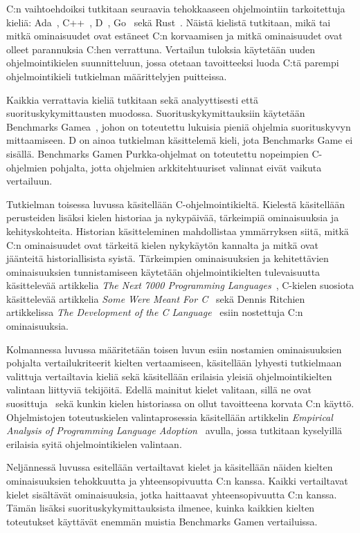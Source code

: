 C:n vaihtoehdoiksi tutkitaan seuraavia tehokkaaseen ohjelmointiin tarkoitettuja
kieliä: Ada~\citep{ADA12}, C++~\citep{CPP17}, D~\citep{D}, Go~\citep{golang}
sekä Rust~\citep{rust}. Näistä kielistä tutkitaan, mikä tai mitkä ominaisuudet
ovat estäneet C:n korvaamisen ja mitkä ominaisuudet ovat olleet parannuksia
C:hen verrattuna. Vertailun tuloksia käytetään uuden ohjelmointikielen
suunnitteluun, jossa otetaan tavoitteeksi luoda C:tä parempi ohjelmointikieli
tutkielman määrittelyjen puitteissa.

Kaikkia verrattavia kieliä tutkitaan sekä analyyttisesti että
suorituskykymittausten muodossa. Suorituskykymittauksiin käytetään Benchmarks
Gamea~\citep{benchmarks}, johon on toteutettu lukuisia pieniä ohjelmia
suorituskyvyn mittaamiseen. D on ainoa tutkielman käsittelemä kieli, jota
Benchmarks Game ei sisällä. Benchmarks Gamen Purkka-ohjelmat on toteutettu
nopeimpien C-ohjelmien pohjalta, jotta ohjelmien arkkitehtuuriset valinnat
eivät vaikuta vertailuun. 

Tutkielman toisessa luvussa käsitellään C-ohjelmointikieltä. Kielestä
käsitellään perusteiden lisäksi kielen historiaa ja nykypäivää, tärkeimpiä
ominaisuuksia ja kehityskohteita. Historian käsitteleminen mahdollistaa
ymmärryksen siitä, mitkä C:n ominaisuudet ovat tärkeitä kielen nykykäytön
kannalta ja mitkä ovat jäänteitä historiallisista syistä. Tärkeimpien
ominaisuuksien ja kehitettävien ominaisuuksien tunnistamiseen käytetään
ohjelmointikielten tulevaisuutta käsittelevää artikkelia \emph{The Next 7000
Programming Languages}~\citep{next7000}, C-kielen suosiota käsittelevää
artikkelia \emph{Some Were Meant For C}~\citep{somemeantforc} sekä Dennis
Ritchien artikkelissa \emph{The Development of the C Language}~\citep{chistory}
esiin nostettuja C:n ominaisuuksia.

Kolmannessa luvussa määritetään toisen luvun esiin nostamien ominaisuuksien
pohjalta vertailukriteerit kielten vertaamiseen, käsitellään lyhyesti
tutkielmaan valittuja vertailtavia kieliä sekä käsitellään erilaisia yleisiä
ohjelmointikielten valintaan liittyviä tekijöitä. Edellä mainitut kielet
valitaan, sillä ne ovat suosittuja~\citep{tiobe} sekä kunkin kielen historiassa
on ollut tavoitteena korvata C:n käyttö. Ohjelmistojen toteutuskielen
valintaprosessia käsitellään artikkelin \emph{Empirical Analysis of Programming
Language Adoption}~\citep{empiricalpopularity} avulla, jossa tutkitaan
kyselyillä erilaisia syitä ohjelmointikielen valintaan.

Neljännessä luvussa esitellään vertailtavat kielet ja käsitellään näiden
kielten ominaisuuksien tehokkuutta ja yhteensopivuutta C:n kanssa. Kaikki
vertailtavat kielet sisältävät ominaisuuksia, jotka haittaavat yhteensopivuutta
C:n kanssa. Tämän lisäksi suorituskykymittauksista ilmenee, kuinka kaikkien
kielten toteutukset käyttävät enemmän muistia Benchmarks Gamen vertailuissa.

